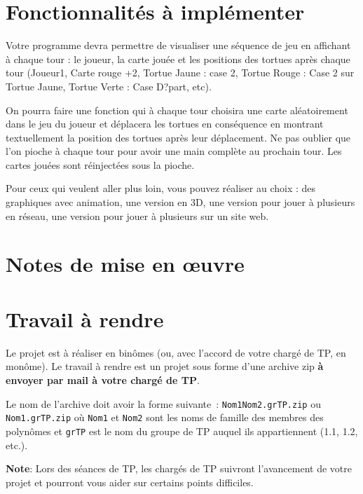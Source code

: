 \documentclass[10pt]{article}
\begin{document}
\section{Fonctionnalit\'es \`a impl\'ementer}

Votre programme devra permettre de visualiser une s\'equence de jeu
en affichant \`a chaque tour : le joueur, la carte jou\'ee et les
positions des tortues apr\`es chaque tour (Joueur1, Carte rouge +2,
Tortue Jaune : case 2, Tortue Rouge : Case 2 sur Tortue Jaune, Tortue
Verte : Case D?part, etc). 

On pourra faire une fonction qui \`a chaque tour choisira une carte
al\'eatoirement dans le jeu du joueur et d\'eplacera les tortues en
cons\'equence en montrant textuellement la position des tortues apr\`es
leur d\'eplacement. Ne pas oublier que l'on pioche \`a chaque tour pour
avoir une main compl\`ete au prochain tour. Les cartes jou\'ees sont
r\'einject\'ees sous la pioche.


Pour ceux qui veulent aller plus loin, vous pouvez r\'ealiser au choix
: des graphiques avec animation, une version en 3D, une version pour
jouer \`a plusieurs en r\'eseau, une version pour jouer \`a plusieurs sur
un site web.


\section{Notes de mise en {\oe}uvre}

\section{Travail \`a rendre}
Le projet est \`a r\'ealiser en bin\^omes (ou, avec l'accord de votre 
charg\'e de TP, en mon\^ome). Le travail \`a rendre est un projet sous forme 
d'une archive zip {\bf \`a envoyer par mail \`a votre charg\'e de TP}. 

\medskip
\noindent
Le nom de l'archive doit avoir la forme suivante~: \texttt{Nom1Nom2.grTP.zip} ou 
\texttt{Nom1.grTP.zip} o\`u \texttt{Nom1} et \texttt{Nom2} sont les noms de 
famille des membres des polyn\^omes et \texttt{grTP} est le nom du groupe de TP 
auquel ils appartiennent (1.1, 1.2, etc.). 

\medskip
\noindent
{\bf Note}: Lors des s\'eances de TP, les charg\'es de TP suivront l'avancement de votre projet et pourront vous aider sur certains points difficiles.
\end{document}
